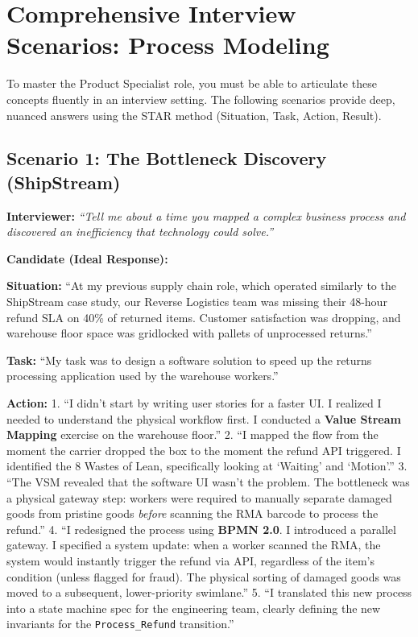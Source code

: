 \bigskip

\section{Comprehensive Interview Scenarios: Process
Modeling}\label{comprehensive-interview-scenarios-process-modeling}

To master the Product Specialist role, you must be able to articulate
these concepts fluently in an interview setting. The following scenarios
provide deep, nuanced answers using the STAR method (Situation, Task,
Action, Result).

\subsection{Scenario 1: The Bottleneck Discovery
(ShipStream)}\label{scenario-1-the-bottleneck-discovery-shipstream}

\textbf{Interviewer:} \emph{``Tell me about a time you mapped a complex
business process and discovered an inefficiency that technology could
solve.''}

\textbf{Candidate (Ideal Response):}

\textbf{Situation:} ``At my previous supply chain role, which operated
similarly to the ShipStream case study, our Reverse Logistics team was
missing their 48-hour refund SLA on 40\% of returned items. Customer
satisfaction was dropping, and warehouse floor space was gridlocked with
pallets of unprocessed returns.''

\textbf{Task:} ``My task was to design a software solution to speed up
the returns processing application used by the warehouse workers.''

\textbf{Action:} 1. ``I didn't start by writing user stories for a
faster UI. I realized I needed to understand the physical workflow
first. I conducted a \textbf{Value Stream Mapping} exercise on the
warehouse floor.'' 2. ``I mapped the flow from the moment the carrier
dropped the box to the moment the refund API triggered. I identified the
8 Wastes of Lean, specifically looking at `Waiting' and `Motion'.'' 3.
``The VSM revealed that the software UI wasn't the problem. The
bottleneck was a physical gateway step: workers were required to
manually separate damaged goods from pristine goods \emph{before}
scanning the RMA barcode to process the refund.'' 4. ``I redesigned the
process using \textbf{BPMN 2.0}. I introduced a parallel gateway. I
specified a system update: when a worker scanned the RMA, the system
would instantly trigger the refund via API, regardless of the item's
condition (unless flagged for fraud). The physical sorting of damaged
goods was moved to a subsequent, lower-priority swimlane.'' 5. ``I
translated this new process into a state machine spec for the
engineering team, clearly defining the new invariants for the
\texttt{Process\_Refund} transition.''

